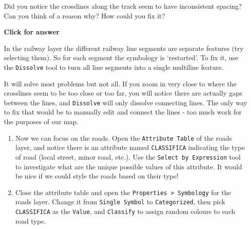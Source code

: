 \documentclass[
  letterpaper,
  DIV=11,
  numbers=noendperiod]{scrreprt}
\begin{document}
\begin{tcolorbox}[enhanced jigsaw, coltitle=black, toprule=.15mm, breakable, opacitybacktitle=0.6, left=2mm, colback=white, leftrule=.75mm, rightrule=.15mm, colbacktitle=quarto-callout-important-color!10!white, toptitle=1mm, titlerule=0mm, colframe=quarto-callout-important-color-frame, arc=.35mm, bottomtitle=1mm, opacityback=0, bottomrule=.15mm, title=\textcolor{quarto-callout-important-color}{\faExclamation}\hspace{0.5em}{Stop and Think}]

Did you notice the crosslines along the track seem to have inconsistent
spacing? Can you think of a reason why? How could you fix it?

\end{tcolorbox}

\begin{tcolorbox}[enhanced jigsaw, toprule=.15mm, breakable, left=2mm, colframe=quarto-callout-important-color-frame, colback=white, arc=.35mm, leftrule=.75mm, opacityback=0, rightrule=.15mm, bottomrule=.15mm]

\vspace{-3mm}\textbf{Click for answer}\vspace{3mm}

In the railway layer the different railway line segments are separate
features (try selecting them). So for each segment the symbology is
`restarted'. To fix it, use the \texttt{Dissolve} tool to turn all line
segments into a single multiline feature.

It will solve most problems but not all. If you zoom in very close to
where the crosslines seem to be too close or too far, you will notice
there are actually gaps between the lines, and \texttt{Dissolve} will
only dissolve connecting lines. The only way to fix that would be to
manually edit and connect the lines - too much work for the purposes of
our map.

\end{tcolorbox}

\begin{enumerate}
\def\labelenumi{(\arabic{enumi})}
\setcounter{enumi}{207}
\item
  Now we can focus on the roads. Open the \texttt{Attribute\ Table} of
  the roads layer, and notice there is an attribute named
  \texttt{CLASSIFICA} indicating the type of road (local street, minor
  road, etc.). Use the \texttt{Select\ by\ Expression} tool to
  investigate what are the unique possible values of this attribute. It
  would be nice if we could style the roads based on their type!
\item
  Close the attribute table and open the
  \texttt{Properties\ \textgreater{}\ Symbology} for the roads layer.
  Change it from \texttt{Single\ Symbol} to \texttt{Categorized}, then
  pick \texttt{CLASSIFICA} as the \texttt{Value}, and \texttt{Classify}
  to assign random colours to each road type.
\end{enumerate}
\end{document}
